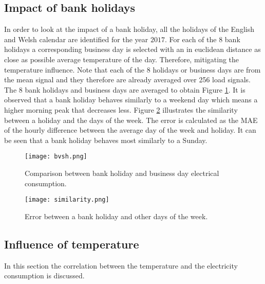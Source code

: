 \subsection{Impact of bank holidays}\label{s:Impact of holidays}
In order to look at the impact of a bank holiday, all the holidays of the English and Welsh calendar are identified for the year $ 2017 $. For each of the $ 8 $ bank holidays a corresponding business day is selected with an in euclidean distance as close as possible average temperature of the day. Therefore, mitigating the temperature influence. Note that each of the 8 holidays or business days are from the mean signal and they therefore are already averaged over 256 load signals. The 8 bank holidays and business days are averaged to obtain Figure \ref{fig:bvsh}. It is observed that a bank holiday behaves similarly to a weekend day which means a higher morning peak that decreases less. Figure \ref{fig:sim_weekdays} illustrates the similarity between a holiday and the days of the week. The error is calculated as the MAE of the hourly difference between the average day of the week and holiday. It can be seen that a bank holiday behaves most similarly to a Sunday.

\begin{figure}[h!]
	\centering
	\texttt{[image: bvsh.png]}
	\caption{Comparison between bank holiday and business day electrical consumption.}
	\label{fig:bvsh}
\end{figure}

\begin{figure}[h!]
	\centering
	\texttt{[image: similarity.png]}
	\caption{Error between a bank holiday and other days of the week.}
	\label{fig:sim_weekdays}
\end{figure}


\subsection{Influence of temperature}
In this section the correlation between the temperature and the electricity consumption is discussed.\\


